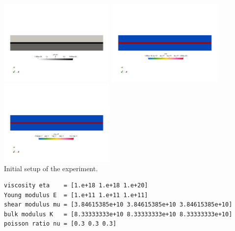 \begin{center}
\includegraphics[width=5.7cm]{python_codes/fieldstone_129/results/experiment1/phase}
\includegraphics[width=5.7cm]{python_codes/fieldstone_129/results/experiment1/eta}
\includegraphics[width=5.7cm]{python_codes/fieldstone_129/results/experiment1/etaeff}\\
{\captionfont Initial setup of the experiment.}
\end{center} 

\begin{verbatim}
viscosity eta    = [1.e+18 1.e+18 1.e+20]
Young modulus E  = [1.e+11 1.e+11 1.e+11]
shear modulus mu = [3.84615385e+10 3.84615385e+10 3.84615385e+10]
bulk modulus K   = [8.33333333e+10 8.33333333e+10 8.33333333e+10]
poisson ratio nu = [0.3 0.3 0.3]
\end{verbatim}


